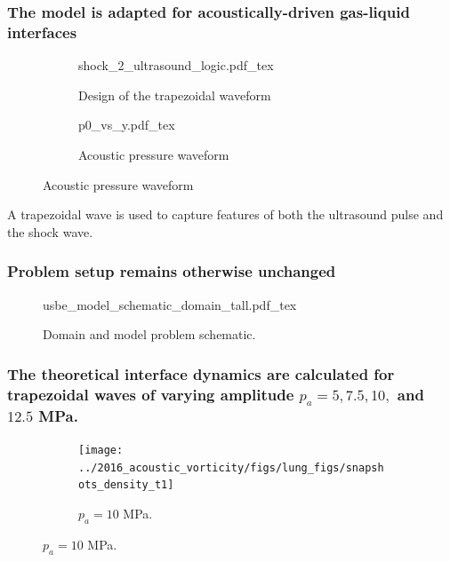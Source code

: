 \begin{frame}
  \frametitle{\vspace*{0.5cm}The model is adapted for acoustically-driven gas-liquid interfaces}
    \begin{figure}
      \centering
      \centering%
      \begin{subfigure}[b]{0.53\textwidth}
        \centering
        \def\svgwidth{\textwidth}%
        {shock_2_ultrasound_logic.pdf_tex}%
        \vspace*{2cm}
        \caption{Design of the trapezoidal waveform}
      \end{subfigure}
      \begin{subfigure}[b]{0.46\textwidth}
        \centering
        \def\svgwidth{\textwidth}
        {\footnotesize
          {p0_vs_y.pdf_tex}%
        }
        \caption{Acoustic pressure waveform}
      \end{subfigure}
    \end{figure}
    A trapezoidal wave is used to capture features of both the ultrasound pulse and the shock wave.
\end{frame}
% 
% 
\begin{frame} \frametitle{\vspace*{0.25cm}Problem setup remains otherwise unchanged}
\vspace*{0.5cm}
  \begin{figure}
    \centering {} {\footnotesize
      {usbe_model_schematic_domain_tall.pdf_tex}
    }
    \caption{\label{fig:problem_schematic} Domain and model problem
      schematic.}
  \end{figure}
\end{frame}
%
%
\begin{frame}
  \frametitle{The theoretical interface dynamics are calculated for trapezoidal waves of varying amplitude $p_a=5, 7.5, 10,$ and $12.5$ MPa.} 
  \begin{figure}
    \centering
    \begin{subfigure}[b]{0.6\textwidth}
      \texttt{[image: ../2016\_acoustic\_vorticity/figs/lung\_figs/snapshots\_density\_t1]}
      \caption{$p_a = 10$ MPa.}
    \end{subfigure}
  \end{figure}

\end{frame}
